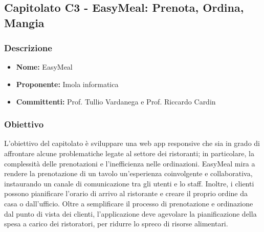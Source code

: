 \subsection{Capitolato C3 - EasyMeal: Prenota, Ordina, Mangia}

\subsubsection{Descrizione}
\begin{itemize}
  \item \textbf{Nome:} EasyMeal
  \item \textbf{Proponente:} Imola informatica
  \item \textbf{Committenti:} Prof. Tullio Vardanega e Prof. Riccardo Cardin
\end{itemize}

\subsubsection{Obiettivo}
L'obiettivo del capitolato è sviluppare una web app responsive che sia in grado di affrontare alcune problematiche legate al settore dei ristoranti; in particolare, la complessità delle prenotazioni e l'inefficienza nelle ordinazioni. EasyMeal mira a rendere la prenotazione di un tavolo un'esperienza coinvolgente e collaborativa, instaurando un canale di comunicazione tra gli utenti e lo staff. Inoltre, i clienti possono pianificare l’orario di arrivo al ristorante e creare il proprio ordine da casa o dall'ufficio. Oltre a semplificare il processo di prenotazione e ordinazione dal punto di vista dei clienti, l’applicazione deve agevolare la pianificazione della spesa a carico dei ristoratori, per ridurre lo spreco di risorse alimentari.

